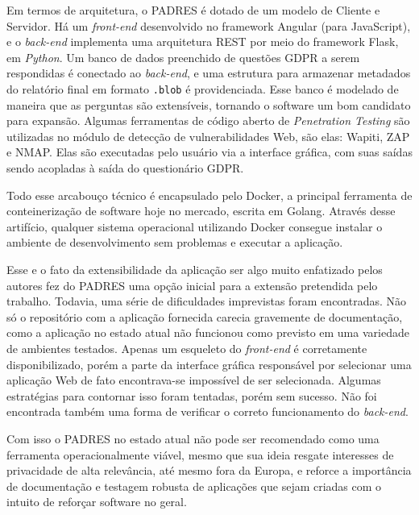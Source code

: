 Em termos de arquitetura, o PADRES é dotado de um modelo de Cliente e Servidor. Há um \textit{front-end} desenvolvido no framework Angular (para JavaScript), e o \textit{back-end} implementa uma arquitetura REST por meio do framework Flask, em \textit{Python}. Um banco de dados preenchido de questões GDPR a serem respondidas é conectado ao \textit{back-end}, e uma estrutura para armazenar metadados do relatório final em formato \verb+.blob+ é providenciada. Esse banco é modelado de maneira que as perguntas são extensíveis, tornando o software um bom candidato para expansão. Algumas ferramentas de código aberto de \textit{Penetration Testing} são utilizadas no módulo de detecção de vulnerabilidades Web, são elas: Wapiti, ZAP e NMAP. Elas são executadas pelo usuário via a interface gráfica, com suas saídas sendo acopladas à saída do questionário GDPR.

Todo esse arcabouço técnico é encapsulado pelo Docker, a principal ferramenta de conteinerização de software hoje no mercado, escrita em Golang. Através desse artifício, qualquer sistema operacional utilizando Docker consegue instalar o ambiente de desenvolvimento sem problemas e executar a aplicação.

Esse e o fato da extensibilidade da aplicação ser algo muito enfatizado pelos autores fez do PADRES uma opção inicial para a extensão pretendida pelo trabalho. Todavia, uma série de dificuldades imprevistas foram encontradas. Não só o repositório com a aplicação fornecida carecia gravemente de documentação, como a aplicação no estado atual não funcionou como previsto em uma variedade de ambientes testados. Apenas um esqueleto do \textit{front-end} é corretamente disponibilizado, porém a parte da interface gráfica responsável por selecionar uma aplicação Web de fato encontrava-se impossível de ser selecionada. Algumas estratégias para contornar isso foram tentadas, porém sem sucesso. Não foi encontrada também uma forma de verificar o correto funcionamento do \textit{back-end}.

Com isso o PADRES no estado atual não pode ser recomendado como uma ferramenta operacionalmente viável, mesmo que sua ideia resgate interesses de privacidade de alta relevância, até mesmo fora da Europa, e reforce a importância de documentação e testagem robusta de aplicações que sejam criadas com o intuito de reforçar software no geral. 

